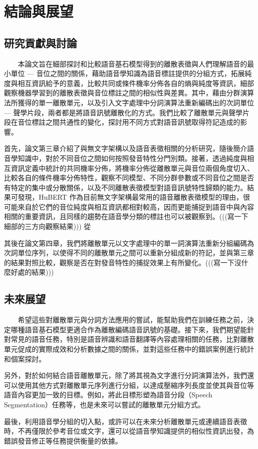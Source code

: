 \chapter{結論與展望} 

\section{研究貢獻與討論}

　　本論文旨在細部探討和比較語音基石模型得到的離散表徵與人們理解語音的最小單位 --- 音位之間的關係，藉助語音學知識為語音標註提供的分組方式，拓展純度與相互資訊給予的意義，比較共同或條件機率分佈各自的熵與純度等資訊，細部觀察機器學習到的離散表徵與音位標註之間的相似性與差異。其中，藉由分群演算法所獲得的單一離散單元，以及引入文字處理中分詞演算法重新編碼出的次詞單位 --- 聲學片段，兩者都是將語音訊號離散化的方式。我們比較了離散單元與聲學片段在音位標註之間共通性的變化，探討用不同方式對語音訊號取得符記造成的影響。

        首先，論文第三章介紹了與無文字架構以及語音表徵相關的分析研究，隨後簡介語音學知識中，對於不同音位之間如何按照發音特性分門別類。接著，透過純度與相互資訊定義中統計的共同機率分佈，將機率分佈從離散單元與音位兩個角度切入、比較各自的條件機率分佈特性，觀察不同模型、不同分群參數或不同音位之間是否有特定的集中或分散關係，以及不同離散表徵模型對語音訊號特性歸類的能力。結果可發現，HuBERT 作為目前無文字架構最常用的語音離散表徵模型的理由，很可能來自於它們的音位純度與相互資訊都相對較高，因而更能捕捉到語音中與內容相關的重要資訊，且同樣的趨勢在語音學分類的標註也可以被觀察到。(((寫一下細部的三方向觀察結果)))
從

        其後在論文第四章\textsl{}，我們將離散單元以文字處理中的單一詞演算法重新分組編碼為次詞單位序列，以使得不同的離散單元之間可以重新分組成新的符記，並與第三章的結果對照比較，觀察是否在對發音特性的捕捉效果上有所變化。(((寫一下沒什麼好處的結果)))

\section{未來展望}

　　希望這些對離散單元與分詞方法應用的嘗試，能幫助我們在訓練任務之前，決定哪種語音基石模型更適合作為離散編碼語音訊號的基礎。接下來，我們期望能針對常見的語音任務，特別是語音辨識和語音翻譯等內容處理相關的任務，比對離散單元促成的實際成效和分析數據之間的關係，並對這些任務中的錯誤案例進行統計和個案探討。

        另外，對於如何結合語音離散單元，除了將其視為文字進行分詞演算法外，我們還可以使用其他方式對離散單元序列進行分組，以達成壓縮序列長度並使其與音位等語音內容更加一致的目標。例如，將此目標形塑為語音分段（Speech Segmentation）任務等，也是未來可以嘗試的離散單元分組方式。

        最後，利用語音學分組的切入點，或許可以在未來分析離散單元或連續語音表徵時，不再僅限於參考音位或文字，還可以從語音學知識提供的相似性資訊出發，為錯誤發音修正等任務提供衡量的依據。
